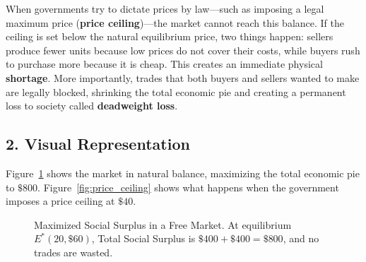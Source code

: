 \documentclass[11pt,letterpaper]{article}
\begin{document}
When governments try to dictate prices by law—such as imposing a legal maximum price (\textbf{price ceiling})—the market cannot reach this balance. If the ceiling is set below the natural equilibrium price, two things happen: sellers produce fewer units because low prices do not cover their costs, while buyers rush to purchase more because it is cheap. This creates an immediate physical \textbf{shortage}. More importantly, trades that both buyers and sellers wanted to make are legally blocked, shrinking the total economic pie and creating a permanent loss to society called \textbf{deadweight loss}.

\subsection*{2. Visual Representation}
Figure~\ref{fig:market_efficiency} shows the market in natural balance, maximizing the total economic pie to $\$800$. Figure~\ref{fig:price_ceiling} shows what happens when the government imposes a price ceiling at $\$40$.

\begin{figure}[htbp]
\centering
{}
\caption{Maximized Social Surplus in a Free Market. At equilibrium $E^*(20, \$60)$, Total Social Surplus is $\$400 + \$400 = \$800$, and no trades are wasted.}
\label{fig:market_efficiency}
\end{figure}
\end{document}
